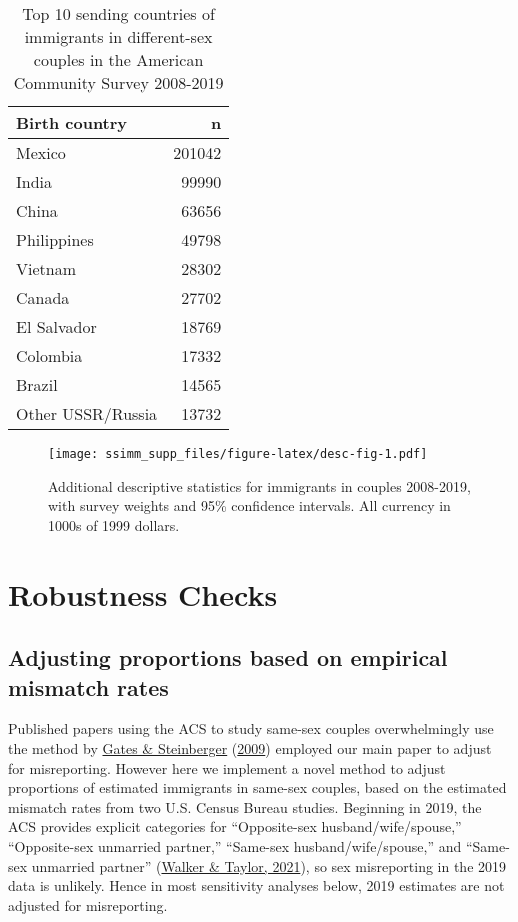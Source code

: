 \documentclass[
  11pt,
]{article}
\begin{document}
\begin{table}[!h]

\caption{\label{tab:desc-top2}Top 10 sending countries of immigrants in different-sex couples in the American Community Survey 2008-2019}
\centering
\begin{tabular}[t]{lr}
\toprule
Birth country & n\\
\midrule
Mexico & 201042\\
India & 99990\\
China & 63656\\
Philippines & 49798\\
Vietnam & 28302\\
\addlinespace
Canada & 27702\\
El Salvador & 18769\\
Colombia & 17332\\
Brazil & 14565\\
Other USSR/Russia & 13732\\
\bottomrule
\end{tabular}
\end{table}

\begin{figure}
\centering
\texttt{[image: ssimm\_supp\_files/figure-latex/desc-fig-1.pdf]}
\caption{\label{fig:desc-fig}Additional descriptive statistics for immigrants in couples 2008-2019, with survey weights and 95\% confidence intervals. All currency in 1000s of 1999 dollars.}
\end{figure}

\newpage

\hypertarget{robustness-checks}{%
\section{Robustness Checks}\label{robustness-checks}}

\hypertarget{adjusting-proportions-based-on-empirical-mismatch-rates}{%
\subsection{Adjusting proportions based on empirical mismatch rates}\label{adjusting-proportions-based-on-empirical-mismatch-rates}}

Published papers using the ACS to study same-sex couples overwhelmingly use the method by \protect\hyperlink{ref-gates_2009}{Gates \& Steinberger} (\protect\hyperlink{ref-gates_2009}{2009}) employed our main paper to adjust for misreporting. However here we implement a novel method to adjust proportions of estimated immigrants in same-sex couples, based on the estimated mismatch rates from two U.S. Census Bureau studies. Beginning in 2019, the ACS provides explicit categories for ``Opposite-sex husband/wife/spouse,'' ``Opposite-sex unmarried partner,'' ``Same-sex husband/wife/spouse,'' and ``Same-sex unmarried partner'' (\protect\hyperlink{ref-walker_2021}{Walker \& Taylor, 2021}), so sex misreporting in the 2019 data is unlikely. Hence in most sensitivity analyses below, 2019 estimates are not adjusted for misreporting.
\end{document}
